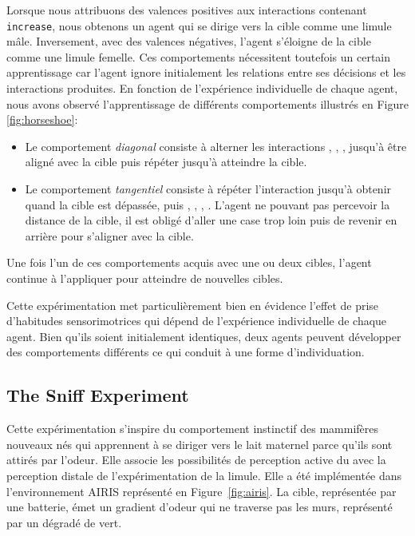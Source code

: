 Lorsque nous attribuons des valences positives aux interactions contenant \texttt{increase}, nous obtenons un agent qui se dirige vers la cible comme une limule mâle. 
Inversement, avec des valences négatives, l'agent s'éloigne de la cible comme une limule femelle.
Ces comportements nécessitent toutefois un certain apprentissage car l'agent ignore initialement les relations entre ses décisions et les interactions produites. 
En fonction de l'expérience individuelle de chaque agent, nous avons observé l'apprentissage de différents comportements illustrés en Figure \ref{fig:horseshoe}: 
\begin{itemize}[label=\scalebox{.85}{$\diamond$}]
	\item Le comportement \emph{diagonal} consiste à alterner les interactions {\small {}, , , } jusqu'à être aligné avec la cible puis répéter {\small {}} jusqu'à atteindre la cible.
	\item Le comportement \emph{tangentiel} consiste à répéter l'interaction {\small {}} jusqu'à obtenir { } quand la cible est dépassée, puis {\small {}, , , }. L'agent ne pouvant pas percevoir la distance de la cible, il est obligé d'aller une case trop loin puis de revenir en arrière pour s'aligner avec la cible. 
\end{itemize}
Une fois l'un de ces comportements acquis avec une ou deux cibles, l’agent continue à l'appliquer pour atteindre de nouvelles cibles.

Cette expérimentation met particulièrement bien en évidence l'effet de prise d'habitudes sensorimotrices qui dépend de l'expérience individuelle de chaque agent. 
Bien qu'ils soient initialement identiques, deux agents peuvent développer des comportements différents ce qui conduit à une forme d'individuation.

\subsection{The Sniff Experiment}
\label{sec:sniff}

\noindent
Cette expérimentation s'inspire du comportement instinctif des mammifères nouveaux nés qui apprennent à se diriger vers le lait maternel parce qu'ils sont attirés par l'odeur. 
Elle associe les possibilités de perception active du  avec la perception distale de l'expérimentation de la limule.
Elle a été implémentée dans l'environnement AIRIS \cite{cook_airis_2023} représenté en Figure~\ref{fig:airis}.
La cible, représentée par une batterie, émet un gradient d'odeur qui ne traverse pas les murs, représenté par un dégradé de vert. 

